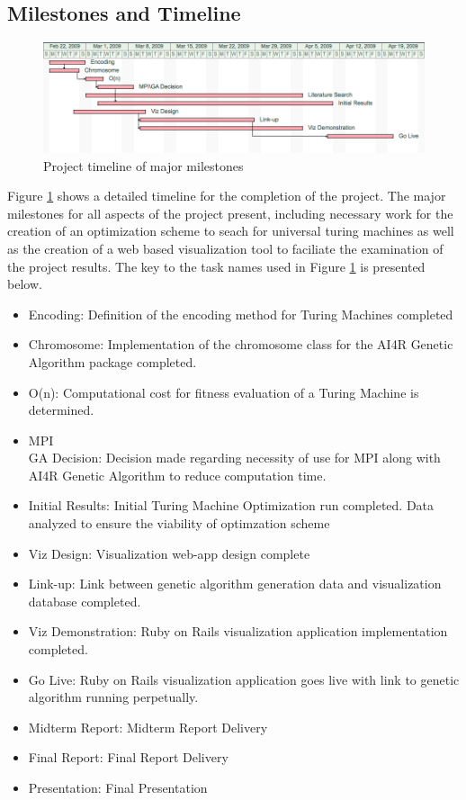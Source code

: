 \subsection{Milestones and Timeline}

\begin{figure}[htp]
\centering
\includegraphics[width=1\textwidth]{images/gantt.png}
\caption{Project timeline of major milestones}\label{fig:gantt}
\end{figure}
Figure \ref{fig:gantt} shows a detailed timeline for the completion of the project. The major milestones for all aspects of the project present, including necessary work for the creation of an optimization scheme to seach for universal turing machines as well as the creation of a web based visualization tool to faciliate the examination of the project results. The key to the task names used in Figure \ref{fig:gantt} is presented below. 
\begin{itemize}
	\item Encoding:	Definition of the encoding method for Turing Machines completed
	\item Chromosome:	Implementation of the chromosome class for the AI4R Genetic Algorithm package completed.
	\item O(n):	Computational cost for fitness evaluation of a Turing Machine is determined.
	\item MPI\\GA Decision:	Decision made regarding necessity of use for MPI along with AI4R Genetic Algorithm to reduce computation time.  
	\item Initial Results:	Initial Turing Machine Optimization run completed. Data analyzed to ensure the viability of optimzation scheme
	\item Viz Design:	Visualization web-app design complete
	\item Link-up:	Link between genetic algorithm generation data and visualization database completed.
	\item Viz Demonstration:	Ruby on Rails visualization application implementation completed.
	\item Go Live:	Ruby on Rails visualization application goes live with link to genetic algorithm running perpetually.
	\item Midterm Report:	Midterm Report Delivery
	\item Final Report:	Final Report Delivery
	\item Presentation:	Final Presentation
\end{itemize}